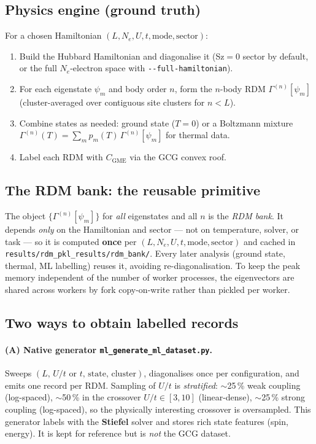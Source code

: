 \documentclass[11pt]{article}
\newcommand{\code}[1]{\texttt{\small #1}}
\newcommand{\CGME}{\ensuremath{C_{\mathrm{GME}}}}
\newcommand{\rdm}{\ensuremath{\Gamma^{(n)}}}
\begin{document}
\subsection{Physics engine (ground truth)}
For a chosen Hamiltonian $(L, N_e, U, t, \text{mode}, \text{sector})$:
\begin{enumerate}[nosep]
  \item Build the Hubbard Hamiltonian and diagonalise it (Sz$=0$ sector by
        default, or the full $N_e$-electron space with \code{-{}-full-hamiltonian}).
  \item For each eigenstate $\psi_m$ and body order $n$, form the $n$-body RDM
        $\rdm[\psi_m]$ (cluster-averaged over contiguous site clusters for $n<L$).
  \item Combine states as needed: ground state ($T=0$) or a Boltzmann mixture
        $\rdm(T)=\sum_m p_m(T)\,\rdm[\psi_m]$ for thermal data.
  \item Label each RDM with \CGME{} via the GCG convex roof.
\end{enumerate}

\subsection{The RDM bank: the reusable primitive}
The object $\{\rdm[\psi_m]\}$ for \emph{all} eigenstates and all $n$ is the
\emph{RDM bank}. It depends \emph{only} on the Hamiltonian and sector --- not on
temperature, solver, or task --- so it is computed \textbf{once} per
$(L,N_e,U,t,\text{mode},\text{sector})$ and cached in
\code{results/rdm\_pkl\_results/rdm\_bank/}. Every later analysis (ground state,
thermal, ML labelling) reuses it, avoiding re-diagonalisation. To keep the peak
memory independent of the number of worker processes, the eigenvectors are
shared across workers by fork copy-on-write rather than pickled per worker.

\subsection{Two ways to obtain labelled records}
\paragraph{(A) Native generator \code{ml\_generate\_ml\_dataset.py}.}
Sweeps $(L,\,U/t \text{ or } t,\,\text{state},\,\text{cluster})$, diagonalises
once per configuration, and emits one record per RDM. Sampling of $U/t$ is
\emph{stratified}: $\sim$25\,\% weak coupling (log-spaced), $\sim$50\,\% in the
crossover $U/t\in[3,10]$ (linear-dense), $\sim$25\,\% strong coupling
(log-spaced), so the physically interesting crossover is oversampled. This
generator labels with the \textbf{Stiefel} solver and stores rich state features
(spin, energy). It is kept for reference but is \emph{not} the GCG dataset.
\end{document}
